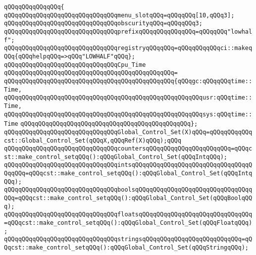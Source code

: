 \verb|qQQqqQQqqQQqqQQq{|\newline
\verb|qQQqqQQqqQQqqQQqqQQqqQQqqQQqqQQqmenu_slotqQQq=qQQqqQQq[10,qQQq3];|\newline
\verb|qQQqqQQqqQQqqQQqqQQqqQQqqQQqqQQqobscurityqQQq=qQQqqQQq3;|\newline
\verb|qQQqqQQqqQQqqQQqqQQqqQQqqQQqqQQqprefixqQQqqQQqqQQqqQQq=qQQqqQQq"lowhalf";|\newline
\newline
\verb|qQQqqQQqqQQqqQQqqQQqqQQqqQQqqQQqregistryqQQqqQQq=qQQqqQQqqQQqci::makeqQQq{qQQqhelpqQQq=>qQQq"LOWHALF"qQQq};|\newline
\newline
\verb|qQQqqQQqqQQqqQQqqQQqqQQqqQQqqQQqCpu_Time|\newline
\verb|qQQqqQQqqQQqqQQqqQQqqQQqqQQqqQQqqQQqqQQqqQQqqQQq=|\newline
\verb|qQQqqQQqqQQqqQQqqQQqqQQqqQQqqQQqqQQqqQQqqQQqqQQq{qQQqgc:qQQqqQQqtime::Time,|\newline
\verb|qQQqqQQqqQQqqQQqqQQqqQQqqQQqqQQqqQQqqQQqqQQqqQQqqQQqqQQqusr:qQQqtime::Time,|\newline
\verb|qQQqqQQqqQQqqQQqqQQqqQQqqQQqqQQqqQQqqQQqqQQqqQQqqQQqqQQqsys:qQQqtime::Time|\newline
\verb|qQQqqQQqqQQqqQQqqQQqqQQqqQQqqQQqqQQqqQQqqQQqqQQq};|\newline
\newline
\verb|qQQqqQQqqQQqqQQqqQQqqQQqqQQqqQQqGlobal_Control_Set(X)qQQq=qQQqqQQqqQQqcst::Global_Control_Set(qQQqX,qQQqRef(X)qQQq);qQQq|\newline
\newline
\verb|qQQqqQQqqQQqqQQqqQQqqQQqqQQqqQQqcountersqQQqqQQqqQQqqQQqqQQqqQQq=qQQqcst::make_control_setqQQq():qQQqGlobal_Control_Set(qQQqIntqQQq);|\newline
\verb|qQQqqQQqqQQqqQQqqQQqqQQqqQQqqQQqintsqQQqqQQqqQQqqQQqqQQqqQQqqQQqqQQqqQQqqQQq=qQQqcst::make_control_setqQQq():qQQqGlobal_Control_Set(qQQqIntqQQq);|\newline
\verb|qQQqqQQqqQQqqQQqqQQqqQQqqQQqqQQqboolsqQQqqQQqqQQqqQQqqQQqqQQqqQQqqQQqqQQq=qQQqcst::make_control_setqQQq():qQQqGlobal_Control_Set(qQQqBoolqQQq);|\newline
\verb|qQQqqQQqqQQqqQQqqQQqqQQqqQQqqQQqfloatsqQQqqQQqqQQqqQQqqQQqqQQqqQQqqQQq=qQQqcst::make_control_setqQQq():qQQqGlobal_Control_Set(qQQqFloatqQQq);|\newline
\verb|qQQqqQQqqQQqqQQqqQQqqQQqqQQqqQQqstringsqQQqqQQqqQQqqQQqqQQqqQQqqQQq=qQQqcst::make_control_setqQQq():qQQqGlobal_Control_Set(qQQqStringqQQq);|\newline
